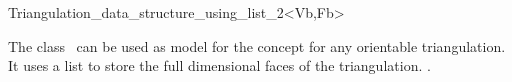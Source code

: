 

\begin{ccRefClass}{Triangulation_data_structure_using_list_2<Vb,Fb>}  %

\ccDefinition
  
The class \ccRefName\ can be used as model
for the  concept
 for any
orientable triangulation. It uses a \stl list to store the
full dimensional faces of the triangulation.
.


\ccIsModel




\end{ccRefClass}


